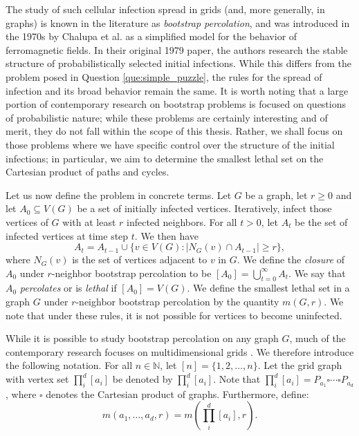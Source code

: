 The study of such cellular infection spread in grids (and, more generally, in graphs) is known in the literature as \emph{bootstrap percolation}, and was introduced in the 1970s by Chalupa et al. \cite{chalupa:1979} as a simplified model for the behavior of ferromagnetic fields. In their original 1979 paper, the authors research the stable structure of probabilistically selected initial infections. While this differs from the problem posed in Question \ref{que:simple_puzzle}, the rules for the spread of infection and its broad behavior remain the same. It is worth noting that a large portion of contemporary research on bootstrap problems is focused on questions of probabilistic nature; while these problems are certainly interesting and of merit, they do not fall within the scope of this thesis. Rather, we shall focus on those problems where we have specific control over the structure of the initial infections; in particular, we aim to determine the smallest lethal set on the Cartesian product of paths and cycles. 

Let us now define the problem in concrete terms. Let $G$ be a graph, let $r \geq 0$ and let $A_0 \subseteq V(G)$ be a set of initially infected vertices. Iteratively, infect those vertices of $G$ with at least $r$ infected neighbors. For all $t > 0$, let $A_t$ be the set of infected vertices at time step $t$. We then have
$$A_t = A_{t-1} \cup \{v \in V(G) : |N_G(v) \cap A_{t-1}| \geq r\},$$
where $N_G(v)$ is the set of vertices adjacent to $v$ in $G$. We define the \emph{closure} of $A_0$ under $r$-neighbor bootstrap percolation to be $[A_0] = \bigcup_{t=0}^{\infty} A_t$. We say that $A_0$ \emph{percolates} or is \emph{lethal} if $[A_0] = V(G)$. We define the smallest lethal set in a graph $G$ under $r$-neighbor bootstrap percolation by the quantity $m(G,r)$. We note that under these rules, it is not possible for vertices to become uninfected.

While it is possible to study bootstrap percolation on any graph $G$, much of the contemporary research focuses on multidimensional grids \cite{something}. We therefore introduce the following notation. For all $n \in \mathbb{N}$, let $[n] = \{1, 2, \dots, n\}$. Let the grid graph with vertex set $\prod_i^d [a_i]$ be denoted by $\prod_i^d [a_i]$. Note that $\prod_i^d [a_i] = P_{a_1} \square \cdots \square P_{a_d}$, where $\square$ denotes the Cartesian product of graphs. Furthermore, define:
$$m(a_1, \dots, a_d, r) = m\left(\prod_i^d [a_i], r\right).$$

